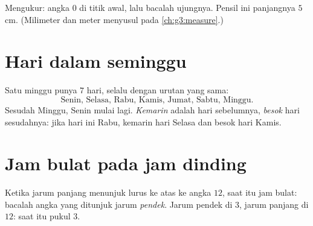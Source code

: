\begin{omfigure}

{\small Mengukur: angka $0$ di titik awal, lalu bacalah ujungnya.
Pensil ini panjangnya $5$ cm. (Milimeter dan meter menyusul pada
\cref{ch:g3:measure}.)}
\end{omfigure}

\section{Hari dalam seminggu}

\begin{example}\label{ex:g1:measure:days}
Satu minggu punya $7$ hari, selalu dengan urutan yang sama:
\[
\text{Senin, Selasa, Rabu, Kamis, Jumat, Sabtu,
Minggu.}
\]
Sesudah Minggu, Senin mulai lagi. \emph{Kemarin} adalah hari
sebelumnya, \emph{besok} hari sesudahnya: jika hari ini Rabu, kemarin
hari Selasa dan besok hari Kamis.
\end{example}

\section{Jam bulat pada jam dinding}

\begin{method}\label{met:g1:measure:clock}
Ketika jarum panjang menunjuk lurus ke atas ke angka $12$, saat itu
jam bulat: bacalah angka yang ditunjuk jarum \emph{pendek}. Jarum
pendek di $3$, jarum panjang di $12$: saat itu pukul $3$.
\end{method}

